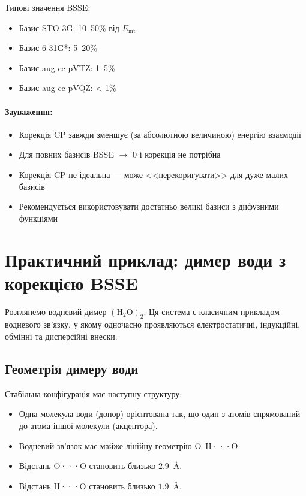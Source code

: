 Типові значення BSSE:
\begin{itemize}
    \item Базис STO-3G: 10--50\% від \(E_{\text{int}}\)
    \item Базис 6-31G*: 5--20\%
    \item Базис aug-cc-pVTZ: 1--5\%
    \item Базис aug-cc-pVQZ: < 1\%
\end{itemize}

\paragraph{Зауваження:}
\begin{itemize}
    \item Корекція CP завжди зменшує (за абсолютною величиною) енергію взаємодії
    \item Для повних базисів BSSE $\to$ 0 і корекція не потрібна
    \item Корекція CP не ідеальна --- може <<перекоригувати>> для дуже малих базисів
    \item Рекомендується використовувати достатньо великі базиси з дифузними функціями
\end{itemize}

\section{Практичний приклад: димер води з корекцією BSSE}

Розглянемо водневий димер \(\mathrm{(H_2O)_2}\). Ця система є класичним прикладом водневого зв'язку, у якому одночасно проявляються електростатичні, індукційні, обмінні та дисперсійні внески.

\subsection{Геометрія димеру води}

Стабільна конфігурація має наступну структуру:
\begin{itemize}
    \item Одна молекула води (донор) орієнтована так, що один з атомів  спрямований до атома  іншої молекули (акцептора).
    \item Водневий зв'язок має майже лінійну геометрію O--H···O.
    \item Відстань O···O становить близько $2.9$~\AA.
    \item Відстань H···O становить близько $1.9$~\AA.
\end{itemize}

